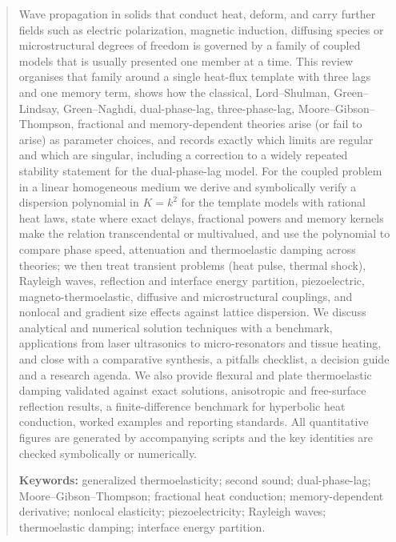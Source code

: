 \begin{abstract}
Wave propagation in solids that conduct heat, deform, and carry further fields such as electric polarization, magnetic induction, diffusing species or microstructural degrees of freedom is governed by a family of coupled models that is usually presented one member at a time. This review organises that family around a single heat-flux template with three lags and one memory term, shows how the classical, Lord--Shulman, Green--Lindsay, Green--Naghdi, dual-phase-lag, three-phase-lag, Moore--Gibson--Thompson, fractional and memory-dependent theories arise (or fail to arise) as parameter choices, and records exactly which limits are regular and which are singular, including a correction to a widely repeated stability statement for the dual-phase-lag model. For the coupled problem in a linear homogeneous medium we derive and symbolically verify a dispersion polynomial in $K=k^2$ for the template models with rational heat laws, state where exact delays, fractional powers and memory kernels make the relation transcendental or multivalued, and use the polynomial to compare phase speed, attenuation and thermoelastic damping across theories; we then treat transient problems (heat pulse, thermal shock), Rayleigh waves, reflection and interface energy partition, piezoelectric, magneto-thermoelastic, diffusive and microstructural couplings, and nonlocal and gradient size effects against lattice dispersion. We discuss analytical and numerical solution techniques with a benchmark, applications from laser ultrasonics to micro-resonators and tissue heating, and close with a comparative synthesis, a pitfalls checklist, a decision guide and a research agenda. We also provide flexural and plate thermoelastic damping validated against exact solutions, anisotropic and free-surface reflection results, a finite-difference benchmark for hyperbolic heat conduction, worked examples and reporting standards. All quantitative figures are generated by accompanying scripts and the key identities are checked symbolically or numerically.
\medskip

\noindent\textbf{Keywords:} generalized thermoelasticity; second sound; dual-phase-lag; Moore--Gibson--Thompson; fractional heat conduction; memory-dependent derivative; nonlocal elasticity; piezoelectricity; Rayleigh waves; thermoelastic damping; interface energy partition.
\end{abstract}
